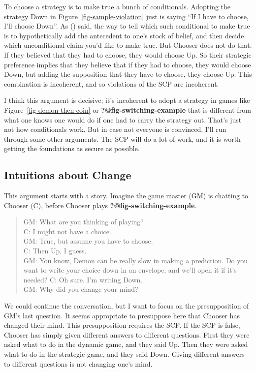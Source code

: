\documentclass[
  10pt,
  letterpaper,
  DIV=11,
  numbers=noendperiod,
  twoside]{scrartcl}
\begin{document}
To choose a strategy is to make true a bunch of conditionals. Adopting
the strategy Down in Figure~\ref{fig-sample-violation} just is saying
``If I have to choose, I'll choose Down''. As
() said, the way to tell
which such conditional to make true is to hypothetically add the
antecedent to one's stock of belief, and then decide which unconditional
claim you'd like to make true. But Chooser does not do that. If they
believed that they had to choose, they would choose Up. So their
strategic preference implies that they believe that if they had to
choose, they would choose Down, but adding the supposition that they
have to choose, they choose Up. This combination is incoherent, and so
violations of the SCP are incoherent.

I think this argument is decisive; it's incoherent to adopt a strategy
in games like Figure~\ref{fig-demon-then-coin} or
\textbf{?@fig-switching-example} that is different from what one knows
one would do if one had to carry the strategy out. That's just not how
conditionals work. But in case not everyone is convinced, I'll run
through some other arguments. The SCP will do a lot of work, and it is
worth getting the foundations as secure as possible.

\subsection{Intuitions about Change}\label{intuitions-about-change}

This argument starts with a story. Imagine the game master (GM) is
chatting to Chooser (C), before Chooser plays
\textbf{?@fig-switching-example}.

\begin{quote}
GM: What are you thinking of playing?\\
C: I might not have a choice.\\
GM: True, but assume you have to choose.\\
C: Then Up, I guess.\\
GM: You know, Demon can be really slow in making a prediction. Do you
want to write your choice down in an envelope, and we'll open it if it's
needed? C: Oh sure. I'm writing Down.\\
GM: Why did you change your mind?
\end{quote}

We could continue the conversation, but I want to focus on the
presupposition of GM's last question. It seems appropriate to presuppose
here that Chooser has changed their mind. This presupposition requires
the SCP. If the SCP is false, Chooser has simply given different answers
to different questions. First they were asked what to do in the dynamic
game, and they said Up. Then they were asked what to do in the strategic
game, and they said Down. Giving different answers to different
questions is not changing one's mind.
\end{document}
